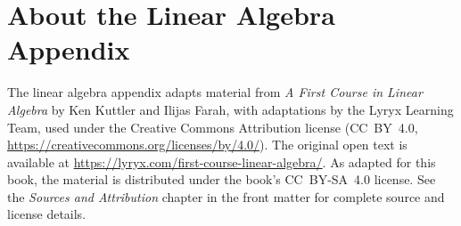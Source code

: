 \section*{About the Linear Algebra Appendix}

The linear algebra appendix adapts material from \emph{A First Course in
Linear Algebra} by Ken Kuttler and Ilijas Farah, with adaptations by the
Lyryx Learning Team, used under the Creative Commons Attribution license
(CC~BY~4.0, \url{https://creativecommons.org/licenses/by/4.0/}).
The original open text is available at
\url{https://lyryx.com/first-course-linear-algebra/}.
As adapted for this book, the material is distributed under the book's
CC~BY-SA~4.0 license. See the \emph{Sources and Attribution} chapter in
the front matter for complete source and license details.
